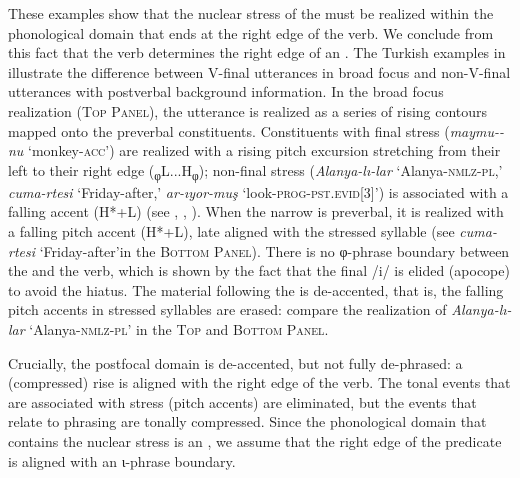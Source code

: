\documentclass[output=paper,colorlinks,citecolor=brown]{langscibook}
\begin{document}
\begin{sloppypar}
These examples show that the nuclear stress of the  must be realized within the phonological domain that ends at the right edge of the verb. We conclude from this fact that the verb determines the right edge of an . The Turkish examples in  illustrate the difference between V-final utterances in broad focus and non-V-final utterances with postverbal background information. In the broad focus realization (\textsc{Top Panel}), the utterance is realized as a series of rising contours mapped onto the preverbal constituents. Constituents with final stress (\textit{maymu-\textquotesingle-nu} `monkey-\textsc{acc}') are realized with a rising pitch excursion stretching from their left to their right edge (\textsubscript{φ}L...H\textsubscript{φ}); non-final stress (\textit{A\textquotesingle lanya-lı-lar} `Alanya-\textsc{nmlz-pl},' \textit{cu\textquotesingle ma-rtesi} `Friday-after,' \textit{ar-ı\textquotesingle yor-muş} `look-\textsc{prog-pst.evid[3]}') is associated with a falling accent (H*+L) (see \citealt[93]{kamali_topics_2011}, \citealt[]{gunes_role_2013}, \citealt[250--257]{fery_intonation_2018}). When the narrow  is preverbal, it is realized with a falling pitch accent (H*+L), late aligned with the stressed syllable (see \textit{cu\textquotesingle ma-rtesi} `Friday-after'in the \textsc{Bottom Panel}). There is no φ-phrase boundary between the  and the verb, which is shown by the fact that the final /i/ is elided (apocope) to avoid the hiatus. The material following the  is de-accented, that is, the falling pitch accents in stressed syllables are erased: compare the realization of \textit{A\textquotesingle lanya-lı-lar} `Alanya-\textsc{nmlz-pl}' in the \textsc{Top} and \textsc{Bottom Panel}.
\end{sloppypar}

Crucially, the postfocal domain is de-accented, but not fully de-phrased: a (compressed) rise is aligned with the right edge of the verb. The tonal events that are associated with stress (pitch accents) are eliminated, but the events that relate to phrasing are tonally compressed. Since the phonological domain that contains the nuclear stress is an , we assume that the right edge of the predicate is aligned with an ι-phrase boundary.  
\end{document}

